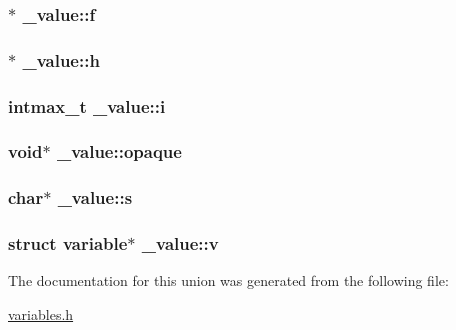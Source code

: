 \subsubsection[{\texorpdfstring{f}{f}}]{$\ast$ \+\_\+value\+::f}\hypertarget{union__value_a032a9c4929695b8c71b036fa9bdc75d2}{}\label{union__value_a032a9c4929695b8c71b036fa9bdc75d2}
\subsubsection[{\texorpdfstring{h}{h}}]{$\ast$ \+\_\+value\+::h}\hypertarget{union__value_a0ea42897a8199c364092a3d9d72e6252}{}\label{union__value_a0ea42897a8199c364092a3d9d72e6252}
\subsubsection[{\texorpdfstring{i}{i}}]{\setlength{\rightskip}{0pt plus 5cm}intmax\+\_\+t \+\_\+value\+::i}\hypertarget{union__value_a6263602a37e5879385c667354e1d5820}{}\label{union__value_a6263602a37e5879385c667354e1d5820}
\subsubsection[{\texorpdfstring{opaque}{opaque}}]{\setlength{\rightskip}{0pt plus 5cm}void$\ast$ \+\_\+value\+::opaque}\hypertarget{union__value_a2344cac871c8663a6717092bff1d5950}{}\label{union__value_a2344cac871c8663a6717092bff1d5950}
\subsubsection[{\texorpdfstring{s}{s}}]{\setlength{\rightskip}{0pt plus 5cm}char$\ast$ \+\_\+value\+::s}\hypertarget{union__value_addb4ab2ffbf877c71d8a8c7cb52e6dd4}{}\label{union__value_addb4ab2ffbf877c71d8a8c7cb52e6dd4}
\subsubsection[{\texorpdfstring{v}{v}}]{\setlength{\rightskip}{0pt plus 5cm}struct {\bf variable}$\ast$ \+\_\+value\+::v}\hypertarget{union__value_a81f5f742f41805c8591187b5b0acc0f2}{}\label{union__value_a81f5f742f41805c8591187b5b0acc0f2}


The documentation for this union was generated from the following file\+:\begin{DoxyCompactItemize}
\item 
\hyperlink{variables_8h}{variables.\+h}\end{DoxyCompactItemize}
